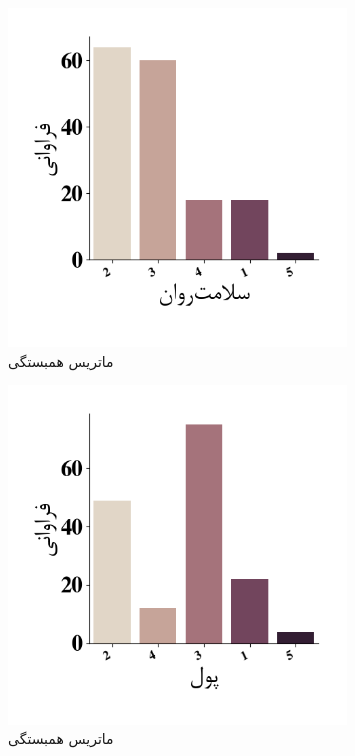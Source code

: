 \begin{figure}[htpb]
    \centering
    \includegraphics[width=0.8\textwidth]{./img/ordinal/MentalHealthQuestion.png}
    \caption{ماتریس همبستگی}
    \label{fig:CorrPlotIntervals}
\end{figure}
\begin{figure}[htpb]
    \centering
    \includegraphics[width=0.8\textwidth]{./img/ordinal/MoneyQuestion.png}
    \caption{ماتریس همبستگی}
    \label{fig:CorrPlotIntervals}
\end{figure}
